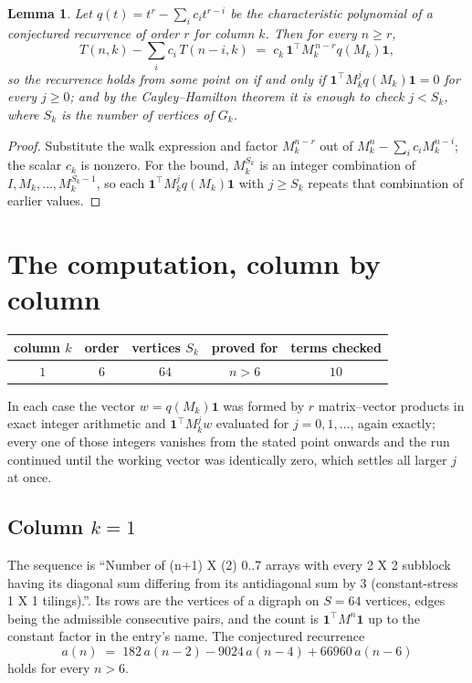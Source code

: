 \documentclass[11pt,a4paper]{article}
\theoremstyle{plain}
\newtheorem{lemma}[theorem]{Lemma}
\theoremstyle{definition}
\begin{document}
\begin{lemma}\label{lem:crit}
Let $q(t)=t^{r}-\sum_i c_it^{r-i}$ be the characteristic polynomial of a conjectured
recurrence of order $r$ for column $k$. Then for every $n\ge r$,
\[
T(n,k)-\sum_i c_i\,T(n-i,k)\;=\;c_k\,\mathbf{1}^{\!\top}M_k^{\,n-r}q(M_k)\mathbf{1},
\]
so the recurrence holds from some point on if and only if
$\mathbf{1}^{\!\top}M_k^{j}q(M_k)\mathbf{1}=0$ for every $j\ge0$; and by the
Cayley--Hamilton theorem it is enough to check $j<S_k$, where $S_k$ is the number of vertices
of $G_k$.
\end{lemma}

\begin{proof}
Substitute the walk expression and factor $M_k^{n-r}$ out of $M_k^{n}-\sum_ic_iM_k^{n-i}$;
the scalar $c_k$ is nonzero. For the bound, $M_k^{S_k}$ is an integer combination of
$I,M_k,\dots,M_k^{S_k-1}$, so each $\mathbf{1}^{\!\top}M_k^{j}q(M_k)\mathbf{1}$ with
$j\ge S_k$ repeats that combination of earlier values.
\end{proof}

\section{The computation, column by column}

\begin{center}
\begin{tabular}{ccccc}
column $k$ & order & vertices $S_k$ & proved for & terms checked \\ \hline
$1$ & $6$ & $64$ & $n>6$ & $10$ \\
\end{tabular}
\end{center}

In each case the vector $w=q(M_k)\mathbf{1}$ was formed by $r$ matrix--vector products in
exact integer arithmetic and $\mathbf{1}^{\!\top}M_k^{j}w$ evaluated for $j=0,1,\dots$,
again exactly; every one of those integers vanishes from the stated point onwards and the run
continued until the working vector was identically zero, which settles all larger $j$ at once.

\subsection*{Column $k=1$}
The sequence is ``Number of (n+1) X (2) 0..7 arrays with every 2 X 2 subblock having its diagonal sum differing from its antidiagonal sum by 3 (constant-stress 1 X 1 tilings).''. Its rows are the vertices of a digraph on
$S=64$ vertices, edges being the admissible consecutive pairs, and the count is
$\mathbf{1}^{\!\top}M^{n}\mathbf{1}$ up to the constant factor in the entry's name.
The conjectured recurrence
\[
a(n)\;=\;182\,a(n-2) - 9024\,a(n-4) + 66960\,a(n-6)
\]
holds for every $n>6$.
\end{document}
